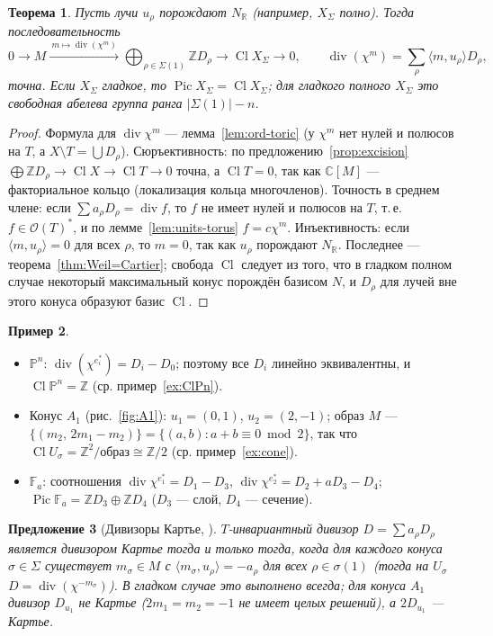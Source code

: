 \documentclass[11pt,a4paper]{article}
\theoremstyle{plain}
\newtheorem{theorem}{Теорема}[section]
\newtheorem{proposition}[theorem]{Предложение}
\theoremstyle{definition}
\newtheorem{example}[theorem]{Пример}
\theoremstyle{remark}
\renewcommand{\C}{\mathbb{C}}
\newcommand{\Z}{\mathbb{Z}}
\newcommand{\R}{\mathbb{R}}
\newcommand{\PP}{\mathbb{P}}
\newcommand{\cO}{\mathcal{O}}
\DeclareMathOperator{\Pic}{Pic}
\DeclareMathOperator{\Cl}{Cl}
\DeclareMathOperator{\divv}{div}
\begin{document}
\begin{theorem}\label{thm:Cl-toric}
Пусть лучи $u_\rho$ порождают $N_\R$ (например, $X_\Sigma$ полно). Тогда последовательность
\[
0\to M\xrightarrow{\ m\mapsto\divv(\chi^m)\ }\bigoplus_{\rho\in\Sigma(1)}\Z D_\rho\to\Cl X_\Sigma\to0,
\qquad \divv(\chi^m)=\sum_\rho\langle m,u_\rho\rangle D_\rho,
\]
точна. Если $X_\Sigma$ гладкое, то $\Pic X_\Sigma=\Cl X_\Sigma$; для гладкого полного $X_\Sigma$ это
свободная абелева группа ранга $|\Sigma(1)|-n$.
\end{theorem}
\begin{proof}
Формула для $\divv\chi^m$ --- лемма~\ref{lem:ord-toric} (у $\chi^m$ нет нулей и полюсов на $T$, а
$X\setminus T=\bigcup D_\rho$). Сюръективность: по предложению~\ref{prop:excision}
$\bigoplus\Z D_\rho\to\Cl X\to\Cl T\to0$ точна, а $\Cl T=0$, так как $\C[M]$ --- факториальное кольцо
(локализация кольца многочленов). Точность в среднем члене: если $\sum a_\rho D_\rho=\divv f$, то $f$
не имеет нулей и полюсов на $T$, т.\,е. $f\in\cO(T)^*$, и по лемме~\ref{lem:units-torus}
$f=c\chi^m$. Инъективность: если $\langle m,u_\rho\rangle=0$ для всех $\rho$, то $m=0$, так как $u_\rho$
порождают $N_\R$. Последнее --- теорема~\ref{thm:Weil=Cartier}; свобода $\Cl$ следует из того, что
в гладком полном случае некоторый максимальный конус порождён базисом $N$, и $D_\rho$ для лучей вне
этого конуса образуют базис $\Cl$.
\end{proof}

\begin{example}
\begin{itemize}
\item $\PP^n$: $\divv(\chi^{e_i^*})=D_i-D_0$; поэтому все $D_i$ линейно эквивалентны, и
$\Cl\PP^n=\Z$ (ср. пример~\ref{ex:ClPn}).
\item Конус $A_1$ (рис.~\ref{fig:A1}): $u_1=(0,1)$, $u_2=(2,-1)$; образ $M$ ---
$\{(m_2,\,2m_1-m_2)\}=\{(a,b): a+b\equiv0\bmod 2\}$, так что $\Cl U_\sigma=\Z^2/\text{образ}\cong
\Z/2$ (ср. пример~\ref{ex:cone}).
\item $\mathbb F_a$: соотношения $\divv\chi^{e_1^*}=D_1-D_3$, $\divv\chi^{e_2^*}=D_2+aD_3-D_4$;
$\Pic\mathbb F_a=\Z D_3\oplus\Z D_4$ ($D_3$ --- слой, $D_4$ --- сечение).
\end{itemize}
\end{example}

\begin{proposition}[{Дивизоры Картье, \cite[4.2]{CLS}}]
$T$-инвариантный дивизор $D=\sum a_\rho D_\rho$ является дивизором Картье тогда и только тогда, когда для
каждого конуса $\sigma\in\Sigma$ существует $m_\sigma\in M$ с $\langle m_\sigma,u_\rho\rangle=-a_\rho$ для
всех $\rho\in\sigma(1)$ (тогда на $U_\sigma$ $D=\divv(\chi^{-m_\sigma})$). В гладком случае это
выполнено всегда; для конуса $A_1$ дивизор $D_{u_1}$ не Картье ($2m_1=m_2=-1$ не имеет целых решений), а
$2D_{u_1}$ --- Картье.
\end{proposition}
\end{document}

